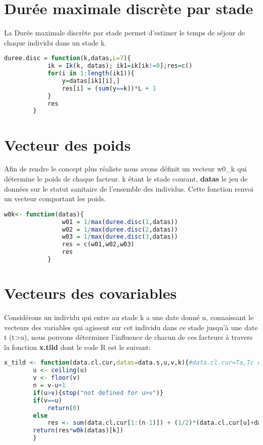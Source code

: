 \documentclass[12pt,a4paper]{scrbook}
\begin{document}
	\section{Durée maximale discrète par stade}
La Durée maximale discrète par stade permet d'estimer le temps de séjour de chaque individu dans un stade k.
	\begin{lstlisting}[language=R]
		duree.disc = function(k,datas,L=7){
			ik = Ik(k, datas); ik1=ik[ik!=0];res=c()
			for(i in 1:length(ik1)){
				y=datas[ik1[i],]
				res[i] = (sum(y==k))*L + 1
			}
			res
		}
	\end{lstlisting}
	\section{Vecteur des poids}
Afin de rendre le concept plus réaliste nous avons définit un vecteur w0\_k qui détermine le poids de chaque facteur. k étant le stade courant, \textbf{datas} le jeu de données sur le statut sanitaire de l'ensemble des individus. Cette fonction renvoi un vecteur comportant les poids.\\
	\begin{lstlisting}[language=R,]
			w0k<- function(datas){
				w01 = 1/max(duree.disc(1,datas))
				w02 = 1/max(duree.disc(2,datas))
				w03 = 1/max(duree.disc(3,datas))
				res = c(w01,w02,w03)
				res
			}
	\end{lstlisting}
	\section{Vecteurs des covariables}
Considérons un individu qui entre au stade k a une date donné u, connaissant le vecteurs des variables qui agissent sur cet individu dans ce stade jusqu'à une date t (t>u), nous pouvons déterminer l'influence de chacun de ces facteurs à travers la fonction \textbf{x.tild} dont le code R est le suivant:\\
	\begin{lstlisting}[language=R]
		x_tild <- function(data.cl.cur,datas=data.s,u,v,k){#data.cl.cur=Ta,Tc ou plv
		u <- ceiling(u) 
		v <- floor(v)   
		n = v-u+1
		if(u>v){stop("not defined for u>v")}
		if(v==u)
			return(0)
		else
			res <- sum(data.cl.cur[1:(n-1)]) + (1/2)*(data.cl.cur[u]+data.cl.cur[v])
		return(res*w0k(datas)[k])
		}
		\end{lstlisting}
\end{document}
